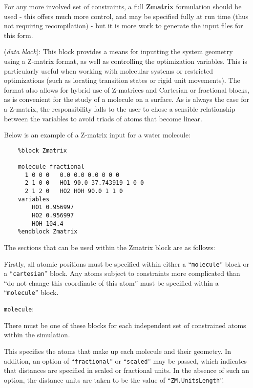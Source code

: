 For any more involved set of constraints, a
full \textbf{Zmatrix} formulation should be used - this
offers much more control, and may be specified fully at
run time (thus not requiring recompilation) - but
it is more work to generate the input files for this form.


\begin{description}
\itemsep 10pt
\parsep 0pt

\item[\textbf{Zmatrix}] (\textit{data block}): 
  This block provides a means for inputting the system geometry using
  a Z-matrix format, as well as controlling the optimization
  variables. This is particularly useful when working with molecular
  systems or restricted optimizations (such as locating transition
  states or rigid unit movements). The format also allows for hybrid
  use of Z-matrices and Cartesian or fractional blocks, as is
  convenient for the study of a molecule on a surface.  As is always
  the case for a Z-matrix, the responsibility falls to the user to
  chose a sensible relationship between the variables to avoid triads
  of atoms that become linear.

Below is an example of a Z-matrix input for a water molecule:
\begin{verbatim}
    %block Zmatrix

    molecule fractional
      1 0 0 0   0.0 0.0 0.0 0 0 0
      2 1 0 0   HO1 90.0 37.743919 1 0 0
      2 1 2 0   HO2 HOH 90.0 1 1 0
    variables
        HO1 0.956997
        HO2 0.956997
        HOH 104.4
    %endblock Zmatrix
\end{verbatim}

The sections that can be used within the Zmatrix block are as follows:

Firstly, all atomic positions must be specified within either a
``\texttt{molecule}'' block or a ``\texttt{cartesian}'' block.  Any
atoms subject to constraints more complicated than ``do not change
this coordinate of this atom'' must be specified within a
``\texttt{molecule}'' block.

\item \texttt{molecule}:

There must be one of these blocks for each independent set of
constrained atoms within the simulation.

This specifies the atoms that make up each molecule and their
geometry. In addition, an option of ``\texttt{fractional}'' or
``\texttt{scaled}'' may be passed, which indicates that distances are
specified in scaled or fractional units. In the absence of such an
option, the distance units are taken to be the value of
``\texttt{ZM.UnitsLength}''.


\end{description}
